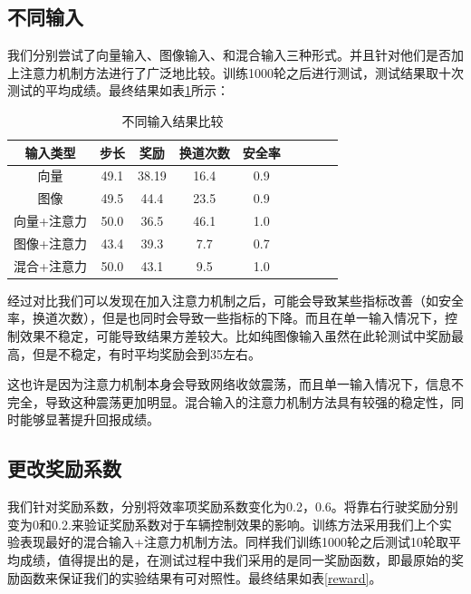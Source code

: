 \documentclass[letterpaper, 10 pt, conference]{ieeeconf}  %
\begin{document}
\subsection[]{不同输入}
我们分别尝试了向量输入、图像输入、和混合输入三种形式。并且针对他们是否加上注意力机制方法进行了广泛地比较。训练1000轮之后进行测试，测试结果取十次测试的平均成绩。最终结果如表\ref{inputtable}所示：
\begin{table}[!htbp] 
    \centering
    \caption{不同输入结果比较}
    \begin{tabular}{ccccccccccc} %
    \toprule %
    \multicolumn{3}{c}{输入类型}& 步长& 奖励&换道次数&安全率\\
    \hline %
    \multicolumn{3}{c}{向量}& 49.1& 38.19& 16.4 &0.9& \\   %
    \multicolumn{3}{c}{图像}& 49.5& 44.4& 23.5 &0.9& \\
    \multicolumn{3}{c}{向量+注意力}& 50.0& 36.5& 46.1 &1.0& \\
    
    \multicolumn{3}{c}{图像+注意力}& 43.4& 39.3& 7.7 & 0.7& \\
    \multicolumn{3}{c}{混合+注意力}& 50.0& 43.1& 9.5 &1.0& \\
    \bottomrule %
    \end{tabular}   
    \label{inputtable} 
\end{table}

经过对比我们可以发现在加入注意力机制之后，可能会导致某些指标改善（如安全率，换道次数），但是也同时会导致一些指标的下降。而且在单一输入情况下，控制效果不稳定，可能导致结果方差较大。比如纯图像输入虽然在此轮测试中奖励最高，但是不稳定，有时平均奖励会到35左右。

这也许是因为注意力机制本身会导致网络收敛震荡，而且单一输入情况下，信息不完全，导致这种震荡更加明显。混合输入的注意力机制方法具有较强的稳定性，同时能够显著提升回报成绩。

\subsection[]{更改奖励系数}
我们针对奖励系数，分别将效率项奖励系数变化为0.2，0.6。将靠右行驶奖励分别变为0和0.2.来验证奖励系数对于车辆控制效果的影响。训练方法采用我们上个实验表现最好的混合输入+注意力机制方法。同样我们训练1000轮之后测试10轮取平均成绩，值得提出的是，在测试过程中我们采用的是同一奖励函数，即最原始的奖励函数来保证我们的实验结果有可对照性。最终结果如表\ref{reward}。
\end{document}

